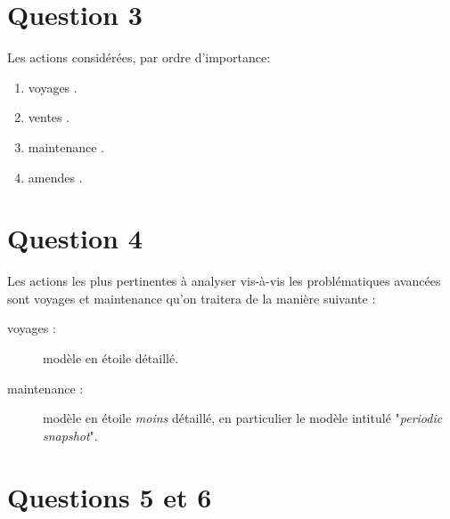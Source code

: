 \documentclass[a4paper,12pt]{report}
\begin{document}
\section*{Question 3}
\label{sec:question_3}

Les actions considérées, par ordre d'importance:
\begin{enumerate}
  \item \og voyages \fg.
  \item \og ventes \fg.
  \item \og maintenance \fg.
  \item \og amendes \fg.
\end{enumerate}

\section*{Question 4}
\label{sec:question_4}

Les actions les plus pertinentes à analyser vis-à-vis les problématiques avancées sont \og voyages \fg et \og maintenance \fg qu'on traitera de la manière suivante :
\begin{description}
  \item [voyages :] modèle en étoile détaillé.
  \item [maintenance :] modèle en étoile \textit{moins} détaillé, en particulier le modèle intitulé "\textit{periodic snapshot}".
\end{description}

\section*{Questions 5 et 6}
\label{sec:question_5_6}
\end{document}
